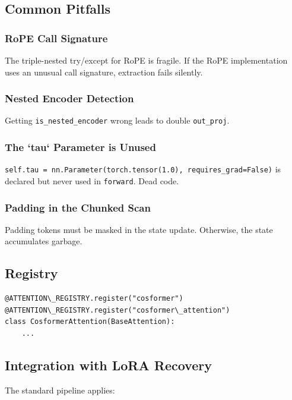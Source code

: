 \subsection{Common Pitfalls}

\subsubsection{RoPE Call Signature}

The triple-nested try/except for RoPE is fragile. If the RoPE implementation 
uses an unusual call signature, extraction fails silently.

\subsubsection{Nested Encoder Detection}

Getting \texttt{is\_nested\_encoder} wrong leads to double \texttt{out\_proj}.

\subsubsection{The `tau` Parameter is Unused}

\texttt{self.tau = nn.Parameter(torch.tensor(1.0), requires\_grad=False)} is 
declared but never used in \texttt{forward}. Dead code.

\subsubsection{Padding in the Chunked Scan}

Padding tokens must be masked in the state update. Otherwise, the state 
accumulates garbage.

\subsection{Registry}

\begin{lstlisting}
@ATTENTION\_REGISTRY.register("cosformer")
@ATTENTION\_REGISTRY.register("cosformer\_attention")
class CosformerAttention(BaseAttention):
    ...
\end{lstlisting}

\subsection{Integration with LoRA Recovery}

The standard pipeline applies:

